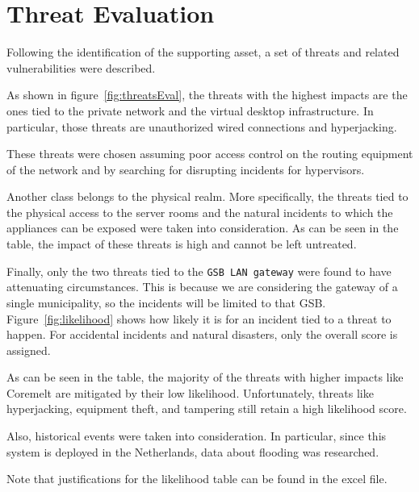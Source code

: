 \section*{Threat Evaluation}

Following the identification of the supporting asset, a set of threats and related vulnerabilities were described. 

As shown in figure~\ref{fig:threatsEval}, the threats with the highest impacts are the ones tied to the private network and the virtual desktop infrastructure. In particular, those threats are unauthorized wired connections and hyperjacking\cite{online:hyperjacking}.

These threats were chosen assuming poor access control on the routing equipment of the network and by searching for disrupting incidents for hypervisors. 

Another class belongs to the physical realm. More specifically, the threats tied to the physical access to the server rooms and the natural incidents to which the appliances can be exposed were taken into consideration. As can be seen in the table, the impact of these threats is high and cannot be left untreated.

Finally, only the two threats tied to the \texttt{GSB LAN gateway} were found to have attenuating circumstances. This is because we are considering the gateway of a single municipality, so the incidents will be limited to that GSB.\\

Figure~\ref{fig:likelihood} shows how likely it is for an incident tied to a threat to happen. For accidental incidents and natural disasters, only the overall score is assigned.

As can be seen in the table, the majority of the threats with higher impacts like Coremelt are mitigated by their low likelihood. Unfortunately, threats like hyperjacking, equipment theft, and tampering still retain a high likelihood score.

Also, historical events were taken into consideration. In particular, since this system is deployed in the Netherlands, data about flooding was researched\cite{online:flooding}.

Note that justifications for the likelihood table can be found in the excel file.\\

\noindent {}



